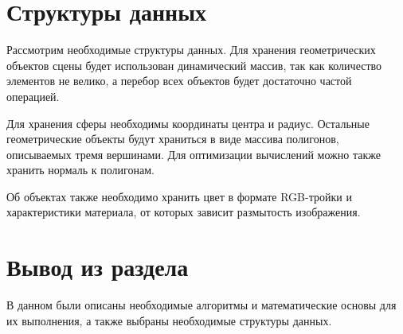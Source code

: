 \section{Структуры данных}

Рассмотрим необходимые структуры данных. Для хранения геометрических объектов сцены будет использован динамический массив, так как количество элементов не велико, а перебор всех объектов будет достаточно частой операцией.

Для хранения сферы необходимы координаты центра и радиус. Остальные геометрические объекты будут храниться в виде массива полигонов, описываемых тремя вершинами. Для оптимизации вычислений можно также хранить нормаль к полигонам.

Об объектах также необходимо хранить цвет в формате RGB-тройки и характеристики материала, от которых зависит размытость изображения.

\section{Вывод из раздела}

В данном были описаны необходимые алгоритмы и математические основы для их выполнения, а также выбраны необходимые структуры данных.